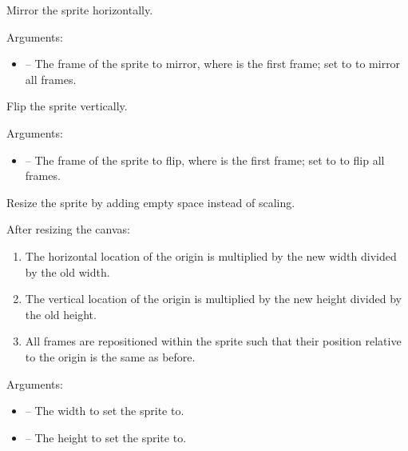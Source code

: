 \documentclass[letterpaper,10pt,english]{sphinxmanual}
\begin{document}

\begin{fulllineitems}
\label{gfx:sge.gfx.Sprite.mirror}
Mirror the sprite horizontally.

Arguments:
\begin{itemize}
\item {} 
 -- The frame of the sprite to mirror, where  is
the first frame; set to  to mirror all frames.

\end{itemize}

\end{fulllineitems}


\begin{fulllineitems}
\label{gfx:sge.gfx.Sprite.flip}
Flip the sprite vertically.

Arguments:
\begin{itemize}
\item {} 
 -- The frame of the sprite to flip, where  is
the first frame; set to  to flip all frames.

\end{itemize}

\end{fulllineitems}


\begin{fulllineitems}
\label{gfx:sge.gfx.Sprite.resize_canvas}
Resize the sprite by adding empty space instead of scaling.

After resizing the canvas:
\begin{enumerate}
\item {} 
The horizontal location of the origin is multiplied by the
new width divided by the old width.

\item {} 
The vertical location of the origin is multiplied by the new
height divided by the old height.

\item {} 
All frames are repositioned within the sprite such that their
position relative to the origin is the same as before.

\end{enumerate}

Arguments:
\begin{itemize}
\item {} 
 -- The width to set the sprite to.

\item {} 
 -- The height to set the sprite to.

\end{itemize}

\end{fulllineitems}
\end{document}
